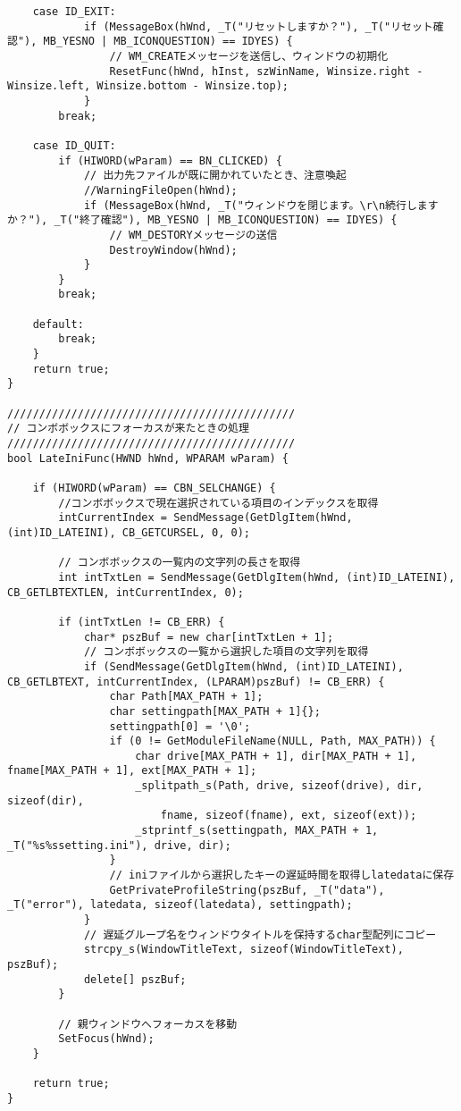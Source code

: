 \begin{verbatim}
	case ID_EXIT:
			if (MessageBox(hWnd, _T("リセットしますか？"), _T("リセット確認"), MB_YESNO | MB_ICONQUESTION) == IDYES) {
				// WM_CREATEメッセージを送信し、ウィンドウの初期化
				ResetFunc(hWnd, hInst, szWinName, Winsize.right - Winsize.left, Winsize.bottom - Winsize.top);
			}
		break;

	case ID_QUIT:
		if (HIWORD(wParam) == BN_CLICKED) {
			// 出力先ファイルが既に開かれていたとき、注意喚起
			//WarningFileOpen(hWnd);
			if (MessageBox(hWnd, _T("ウィンドウを閉じます。\r\n続行しますか？"), _T("終了確認"), MB_YESNO | MB_ICONQUESTION) == IDYES) {
				// WM_DESTORYメッセージの送信
				DestroyWindow(hWnd);
			}
		}
		break;
	
	default:
		break;
	}
	return true;
}

/////////////////////////////////////////////
// コンボボックスにフォーカスが来たときの処理
/////////////////////////////////////////////
bool LateIniFunc(HWND hWnd, WPARAM wParam) {

	if (HIWORD(wParam) == CBN_SELCHANGE) {
		//コンボボックスで現在選択されている項目のインデックスを取得
		intCurrentIndex = SendMessage(GetDlgItem(hWnd, (int)ID_LATEINI), CB_GETCURSEL, 0, 0);
		
		// コンボボックスの一覧内の文字列の長さを取得
		int intTxtLen = SendMessage(GetDlgItem(hWnd, (int)ID_LATEINI), CB_GETLBTEXTLEN, intCurrentIndex, 0);

		if (intTxtLen != CB_ERR) {
			char* pszBuf = new char[intTxtLen + 1];
			// コンボボックスの一覧から選択した項目の文字列を取得
			if (SendMessage(GetDlgItem(hWnd, (int)ID_LATEINI), CB_GETLBTEXT, intCurrentIndex, (LPARAM)pszBuf) != CB_ERR) {
				char Path[MAX_PATH + 1];
				char settingpath[MAX_PATH + 1]{};
				settingpath[0] = '\0';
				if (0 != GetModuleFileName(NULL, Path, MAX_PATH)) {
					char drive[MAX_PATH + 1], dir[MAX_PATH + 1], fname[MAX_PATH + 1], ext[MAX_PATH + 1];
					_splitpath_s(Path, drive, sizeof(drive), dir, sizeof(dir),
						fname, sizeof(fname), ext, sizeof(ext));
					_stprintf_s(settingpath, MAX_PATH + 1, _T("%s%ssetting.ini"), drive, dir);
				}
				// iniファイルから選択したキーの遅延時間を取得しlatedataに保存
				GetPrivateProfileString(pszBuf, _T("data"), _T("error"), latedata, sizeof(latedata), settingpath);
			}
			// 遅延グループ名をウィンドウタイトルを保持するchar型配列にコピー
			strcpy_s(WindowTitleText, sizeof(WindowTitleText), pszBuf);
			delete[] pszBuf;
		}

		// 親ウィンドウへフォーカスを移動
		SetFocus(hWnd);
	}
	
	return true;
}


\end{verbatim}
